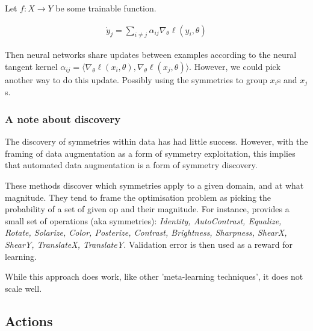 Let $f: X \to Y$ be some trainable function.

\begin{align*}
\dot y_j = \sum_{i\neq j} \alpha_{ij} \nabla_{\theta} \ell(y_i, \theta)
\end{align*}

Then neural networks share updates between examples according to the neural tangent kernel
$\alpha_{ij} = \langle \nabla_{\theta} \ell(x_i, \theta), \nabla_{\theta} \ell(x_j, \theta)\rangle$.
However, we could pick another way to do this update. Possibly using the symmetries to group $x_i$s and $x_j$s.

%
%

\subsubsection{A note about discovery}

The discovery of symmetries within data has had little success.
However, with the framing of data augmentation as a form of symmetry exploitation,
this implies that automated data augmentation \cite{Ho2019a, Lim2019, Cubuk2018, Cubuk2019} is a form of symmetry discovery.

These methods discover which symmetries apply to a given domain, and at what magnitude.
They tend to frame the optimisation problem as picking the probability of a set of given op and their magnitude.
For instance, \cite{Ho2019a} provides a small set of operations (aka symmetries):
\textit{Identity, AutoContrast, Equalize, Rotate, Solarize, Color, Posterize, Contrast,
	Brightness, Sharpness, ShearX, ShearY, TranslateX, TranslateY.}
Validation error is then used as a reward for learning.

While this approach does work, like other 'meta-learning techniques', it does not scale well.

\subsection{Actions}\label{construct-actions}

